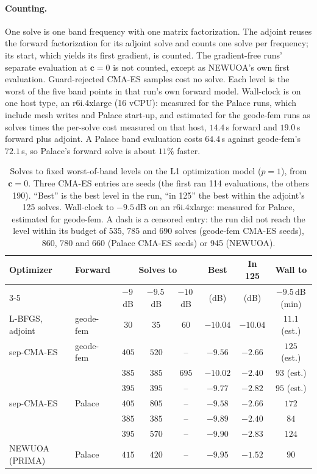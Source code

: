 \documentclass{anvil-paper}
\begin{document}
\paragraph{Counting.}
One solve is one band frequency with one matrix factorization. The adjoint
reuses the forward factorization for its adjoint solve and counts one solve
per frequency; its start, which yields its first gradient, is counted. The
gradient-free runs' separate evaluation at $\mathbf{c} = 0$ is not counted,
except as NEWUOA's own first evaluation. Guard-rejected CMA-ES samples cost
no solve. Each level is the worst of the five band points in that run's own
forward model. Wall-clock is on one host type, an r6i.4xlarge (16 vCPU):
measured for the Palace runs, which include mesh writes and Palace start-up,
and estimated for the geode-fem runs as solves times the per-solve cost
measured on that host, $14.4$\,s forward and $19.0$\,s forward plus adjoint.
A Palace band evaluation costs $64.4$\,s against geode-fem's $72.1$\,s, so
Palace's forward solve is about $11\%$ faster.

\begin{table}[t]
  \centering
  \caption{Solves to fixed worst-of-band levels on the L1 optimization model
  ($p = 1$), from $\mathbf{c} = 0$. Three CMA-ES entries are seeds (the
  first ran 114 evaluations, the others 190). ``Best'' is the best level in
  the run, ``in 125'' the best within the adjoint's 125 solves. Wall-clock
  to $-9.5$\,dB on an r6i.4xlarge: measured for Palace, estimated for
  geode-fem. A dash is a censored entry: the run did not reach the level
  within its budget of 535, 785 and 690 solves (geode-fem CMA-ES seeds),
  860, 780 and 660 (Palace CMA-ES seeds) or 945 (NEWUOA).}
  \label{tab:baselines}
  \small
  \setlength{\tabcolsep}{4pt}
  \begin{tabular}{@{}l l c c c c c c@{}}
    \toprule
    Optimizer & Forward & \multicolumn{3}{c}{Solves to} & Best & In 125 & Wall to \\
    \cmidrule(lr){3-5}
    & & $-9$\,dB & $-9.5$\,dB & $-10$\,dB & (dB) & (dB) & $-9.5$\,dB (min) \\
    \midrule
    L-BFGS, adjoint & geode-fem & $30$ & $35$ & $60$ & $-10.04$ & $-10.04$ & $11.1$ (est.) \\
    sep-CMA-ES & geode-fem & $405$ & $520$ & -- & $-9.56$ & $-2.66$ & $125$ (est.) \\
    & & $385$ & $385$ & $695$ & $-10.02$ & $-2.40$ & $93$ (est.) \\
    & & $395$ & $395$ & -- & $-9.77$ & $-2.82$ & $95$ (est.) \\
    sep-CMA-ES & Palace & $405$ & $805$ & -- & $-9.58$ & $-2.66$ & $172$ \\
    & & $385$ & $385$ & -- & $-9.89$ & $-2.40$ & $84$ \\
    & & $395$ & $570$ & -- & $-9.90$ & $-2.83$ & $124$ \\
    NEWUOA (PRIMA) & Palace & $415$ & $420$ & -- & $-9.95$ & $-1.52$ & $90$ \\
    \bottomrule
  \end{tabular}
\end{table}
\end{document}
